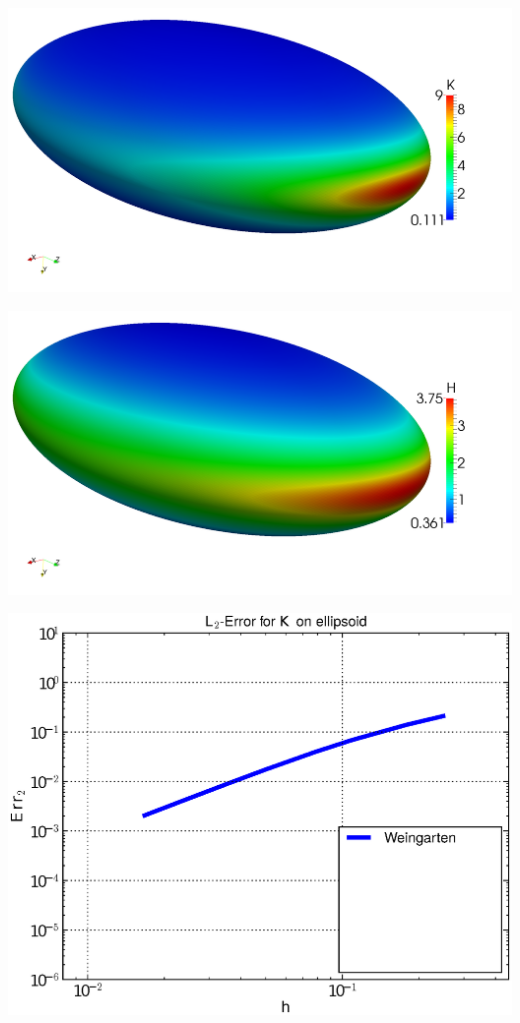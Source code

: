 \documentclass[handout]{beamer}
\begin{document}
\begin{frame}
\begin{overprint}
\begin{minipage}[t]{0.49\textwidth}
              \centering\includegraphics[width=\textwidth]{bilder/Curvature/heineC/K2k.png}
            \end{minipage}\hfill
            \begin{minipage}[t]{0.49\textwidth}
              \centering\includegraphics[width=\textwidth]{bilder/Curvature/heineC/H2k.png}
            \end{minipage}
          \begin{minipage}[t]{0.49\textwidth}
            \centering\includegraphics[width=\textwidth]{bilder/Curvature/heineC/ErrKL2_1.eps}

\end{minipage}
\end{overprint}
\end{frame}
\end{document}
